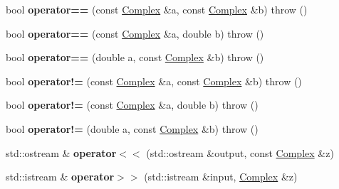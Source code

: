 \begin{DoxyCompactItemize}
bool {\bfseries operator==} (const \hyperlink{classkerbal_1_1math_1_1_complex}{Complex} \&a, const \hyperlink{classkerbal_1_1math_1_1_complex}{Complex} \&b)  throw ()
\item 
\mbox{\label{classkerbal_1_1math_1_1_complex_acba218467515f5d4002e888c18588a65}} 
bool {\bfseries operator==} (const \hyperlink{classkerbal_1_1math_1_1_complex}{Complex} \&a, double b)  throw ()
\item 
\mbox{\label{classkerbal_1_1math_1_1_complex_a24ef249fb8c40d2c7d9fb7eb54f52700}} 
bool {\bfseries operator==} (double a, const \hyperlink{classkerbal_1_1math_1_1_complex}{Complex} \&b)  throw ()
\item 
\mbox{\label{classkerbal_1_1math_1_1_complex_a07384f7f86fd68794a0f9292c5c63ad8}} 
bool {\bfseries operator!=} (const \hyperlink{classkerbal_1_1math_1_1_complex}{Complex} \&a, const \hyperlink{classkerbal_1_1math_1_1_complex}{Complex} \&b)  throw ()
\item 
\mbox{\label{classkerbal_1_1math_1_1_complex_ab77c73c3172fee0eaea443642c1bfec6}} 
bool {\bfseries operator!=} (const \hyperlink{classkerbal_1_1math_1_1_complex}{Complex} \&a, double b)  throw ()
\item 
\mbox{\label{classkerbal_1_1math_1_1_complex_aceb48d571f7530a77bb059c0ba066679}} 
bool {\bfseries operator!=} (double a, const \hyperlink{classkerbal_1_1math_1_1_complex}{Complex} \&b)  throw ()
\item 
\mbox{\label{classkerbal_1_1math_1_1_complex_a8ebd406e87b45a28be463fd809054a9f}} 
std\+::ostream \& {\bfseries operator$<$$<$} (std\+::ostream \&output, const \hyperlink{classkerbal_1_1math_1_1_complex}{Complex} \&z)
\item 
\mbox{\label{classkerbal_1_1math_1_1_complex_abb930734b396a48737367584079350cf}} 
std\+::istream \& {\bfseries operator$>$$>$} (std\+::istream \&input, \hyperlink{classkerbal_1_1math_1_1_complex}{Complex} \&z)
\item 
\mbox{\label{classkerbal_1_1math_1_1_complex_a1d4c6282dcec6ed710a405efed0514b7}} 

\end{DoxyCompactItemize}
